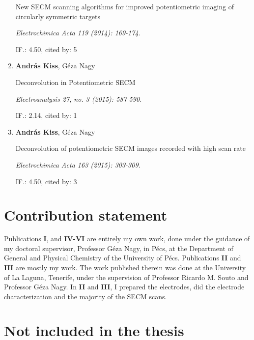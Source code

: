 \begin{enumerate}
New SECM scanning algorithms for improved potentiometric imaging of circularly symmetric targets 

\emph{Electrochimica Acta 119 (2014): 169-174.}

IF.: 4.50, cited by: 5

\item \textbf{András Kiss}, Géza Nagy

Deconvolution in Potentiometric SECM

\emph{Electroanalysis 27, no. 3 (2015): 587-590.}

IF.: 2.14, cited by: 1

\item \textbf{András Kiss}, Géza Nagy

Deconvolution of potentiometric SECM images recorded with high scan rate

\emph{Electrochimica Acta 163 (2015): 303-309.}

IF.: 4.50, cited by: 3

\end{enumerate}
\section*{Contribution statement}
Publications \textbf{I}, and \textbf{IV-VI} are entirely my own work, done under the guidance of my doctoral supervisor, Professor Géza Nagy, in Pécs, at the Department of General and Physical Chemistry of the University of Pécs.
Publications \textbf{II} and \textbf{III} are mostly my work.
The work published therein was done at the University of La Laguna, Tenerife, under the supervision of Professor Ricardo M. Souto and Professor Géza Nagy.
In \textbf{II} and \textbf{III}, I prepared the electrodes, did the electrode characterization and the majority of the SECM scans. 
\section*{Not included in the thesis}

